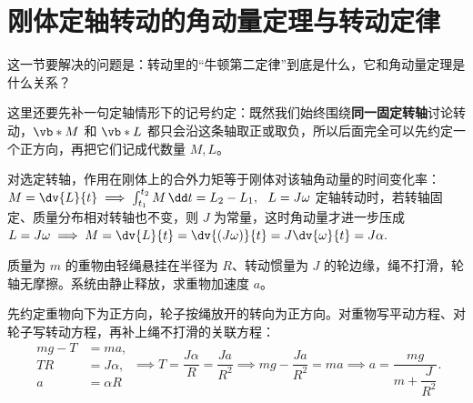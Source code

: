 
\section{刚体定轴转动的角动量定理与转动定律}

这一节要解决的问题是：转动里的“牛顿第二定律”到底是什么，它和角动量定理是什么关系？

这里还要先补一句定轴情形下的记号约定：既然我们始终围绕\textbf{同一固定转轴}讨论转动，\(\vb*{M}\) 和 \(\vb*{L}\) 都只会沿这条轴取正或取负，所以后面完全可以先约定一个正方向，再把它们记成代数量 \(M,L\)。

\begin{theorem}[刚体定轴转动的角动量定理]\label{thm:rigid-body-angular-momentum-theorem}
对选定转轴，作用在刚体上的合外力矩等于刚体对该轴角动量的时间变化率：
 \(M=\dv{L}{t} \implies \int_{t_1}^{t_2} M\,\dd t=L_2-L_1,~~L=J\omega\) 定轴转动时，若转轴固定、质量分布相对转轴也不变，则 \(J\) 为常量，这时角动量才进一步压成
 \(L=J\omega \implies M=\dv{L}{t} =\dv{(J\omega)}{t} =J\dv{\omega}{t} =J\alpha.\) 
\end{theorem}


\begin{exercise}
质量为 \(m\) 的重物由轻绳悬挂在半径为 \(R\)、转动惯量为 \(J\) 的轮边缘，绳不打滑，轮轴无摩擦。系统由静止释放，求重物加速度 \(a\)。
\end{exercise}
\begin{solution}
先约定重物向下为正方向，轮子按绳放开的转向为正方向。对重物写平动方程、对轮子写转动方程，再补上绳不打滑的关联方程：
\[
\begin{aligned}
mg-T&=ma,\\
TR&=J\alpha,\\
a&=\alpha R
\end{aligned}
\implies
T=\frac{J\alpha}{R}=\frac{Ja}{R^2}
\implies
mg-\frac{Ja}{R^2}=ma
\implies
a=\frac{mg}{m+\dfrac{J}{R^2}}.
\]
\end{solution}

